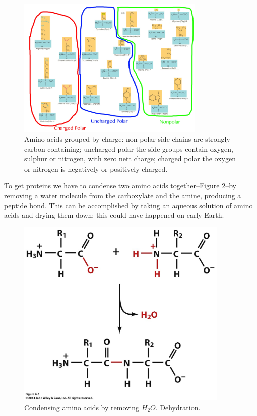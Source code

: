 \documentclass[]{article}
\begin{document}
\begin{figure}[H]
	\caption{Amino acids grouped by charge: non-polar side chains are strongly carbon containing; uncharged polar the side groups contain oxygen, sulphur or nitrogen, with zero nett charge; charged polar the oxygen or nitrogen is negatively or positively charged. }\label{fig:AminoAcidsGrouped} 
	\includegraphics[width=0.8\textwidth]{AminoAcidsGrouped}
\end{figure}
 To get proteins we have to condense two amino acids together--Figure \ref{fig:AminoAcidsCondensed}--by removing a water molecule from the carboxylate and the amine, producing a peptide bond. This can be accomplished by taking an aqueous solution of amino acids and drying them down; this could have happened on early Earth.
\begin{figure}[H]
	\caption{Condensing amino acids by removing $H_2O$. Dehydration.}\label{fig:AminoAcidsCondensed} 
	\includegraphics[width=0.9\textwidth]{AminoAcidsCondensed}
\end{figure}
\end{document}
